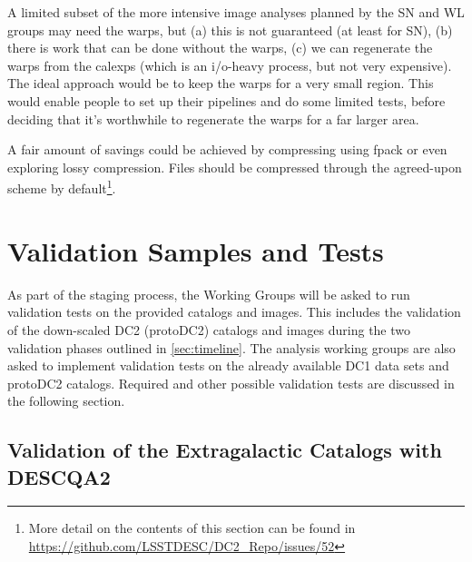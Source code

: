 \documentclass[preprint,times]{aastex61}
\begin{document}
A limited subset of the more intensive image analyses planned by the SN and WL groups may need the warps, but (a) this is not guaranteed (at least for SN), (b) there is work that can be done without the warps, (c) we can regenerate the warps from the calexps (which is an i/o-heavy process, but not very expensive).  The ideal approach would be to keep the warps for a very small region. This would enable people to set up their pipelines and do some limited tests, before deciding that it's worthwhile to regenerate the warps for a far larger area.

A fair amount of savings could be achieved by compressing using fpack or even exploring lossy compression.  Files should be compressed through the agreed-upon scheme by default\footnote{More detail on the contents of this section can be found in \url{https://github.com/LSSTDESC/DC2_Repo/issues/52}}.

\section{Validation Samples and Tests}
\label{sec:validation}

As part of the staging process, the Working Groups will be asked to run validation tests on the provided catalogs and images. This includes the validation of the down-scaled DC2 (protoDC2) catalogs and images during the two validation phases outlined in \autoref{sec:timeline}. The analysis working groups are also asked to implement validation tests on the already available DC1 data sets and protoDC2 catalogs. Required and other possible validation tests are discussed in the following section.


\subsection{Validation of the Extragalactic Catalogs with DESCQA2}
\end{document}

